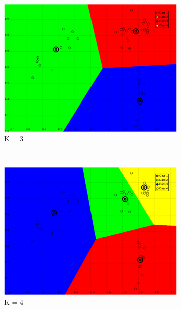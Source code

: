 \documentclass[a4paper,10pt]{article}
\begin{document}
\begin{figure}[H]
\centering
    \begin{subfigure}[t]{0.2\textwidth}
      \centering
      \includegraphics[width=\textwidth]{pictures/dataset_1_Kmeans-L2-3K}
      \caption{K = 3}
      \label{fig:dataset_1_Kmeans-L2-3K}
     \end{subfigure}
      ~
    \begin{subfigure}[t]{0.2\textwidth}
      \centering
      \includegraphics[width=\textwidth]{pictures/dataset_1_Kmeans-L2-4K}
      \caption{K = 4}
      \label{fig:dataset_1_Kmeans-L2-4K}
     \end{subfigure}
      ~
    \begin{subfigure}[t]{0.2\textwidth}

\end{subfigure}
\end{figure}
\end{document}
